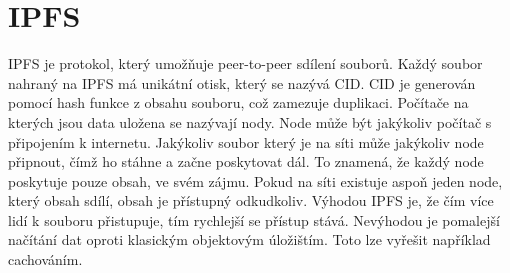 \chapter{IPFS}
IPFS je protokol, který umožňuje peer-to-peer sdílení souborů. Každý soubor nahraný na IPFS má unikátní otisk, který se nazývá CID. CID je generován pomocí hash funkce z obsahu souboru, což zamezuje duplikaci. Počítače na kterých jsou data uložena se nazývají nody. Node může být jakýkoliv počítač s připojením k internetu. Jakýkoliv soubor který je na síti může jakýkoliv node připnout, čímž ho stáhne a začne poskytovat dál. To znamená, že každý node poskytuje pouze obsah, ve svém zájmu. Pokud na síti existuje aspoň jeden node, který obsah sdílí, obsah je přístupný odkudkoliv. Výhodou IPFS je, že čím více lidí k souboru přistupuje, tím rychlejší se přístup stává. Nevýhodou je pomalejší načítání dat oproti klasickým objektovým úložištím. Toto lze vyřešit například cachováním.